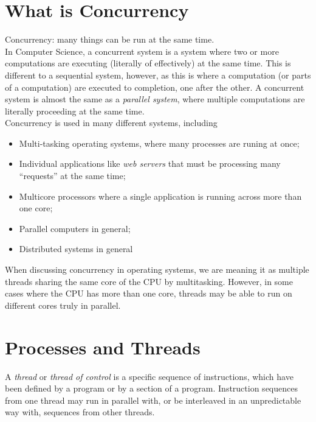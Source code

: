 
\section{What is Concurrency}
Concurrency: many things can be run at the same time.\\

In Computer Science, a concurrent system is a system where two or more computations are executing (literally of effectively) at the same time. This is different to a sequential system, however, as this is where a computation (or parts of a computation) are executed to completion, one after the other. A concurrent system is almost the same as a \textit{parallel system}, where multiple computations are literally proceeding at the same time.\\

Concurrency is used in many different systems, including
\begin{itemize}
    \item Multi-tasking operating systems, where many processes are runing at once;
    \item Individual applications like \textit{web servers} that must be processing many ``requests'' at the same time;
    \item Multicore processors where a single application is running across more than one core;
    \item Parallel computers in general;
    \item Distributed systems in general
\end{itemize}

When discussing concurrency in operating systems, we are meaning it as multiple threads sharing the same core of the CPU by multitasking. However, in some cases where the CPU has more than one core, threads may be able to run on different cores truly in parallel.

\section{Processes and Threads}
A \textit{thread} or \textit{thread of control} is a specific sequence of instructions, which have been defined by a program or by a section of a program. Instruction sequences from one thread may run in parallel with, or be interleaved in an unpredictable way with, sequences from other threads.\\

